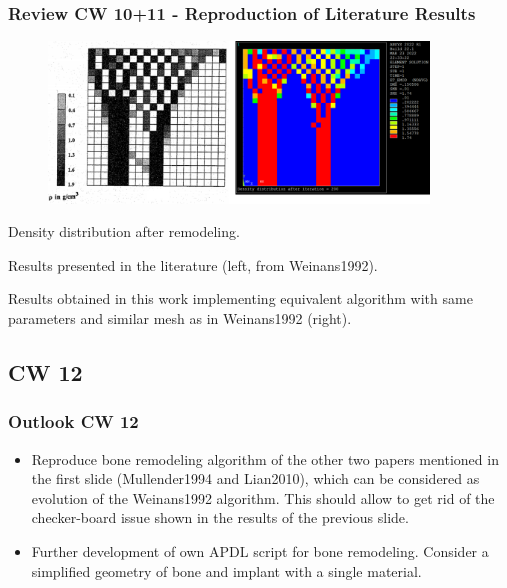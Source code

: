 \begin{frame}
  \frametitle{Review CW 10+11 - Reproduction of Literature Results}
	\begin{figure}
		\includegraphics[width=0.9\textwidth]{pictures/2022_CW10+11_2}
	\end{figure}
	\centering Density distribution after remodeling. 
	
	\centering Results presented in the literature (left, from Weinans1992).
	
	\centering Results obtained in this work implementing equivalent algorithm with same parameters and similar mesh as in Weinans1992 (right).
\end{frame}

\subsection{CW 12}
\begin{frame}
  \frametitle{Outlook CW 12}
	\begin{itemize}
		\item Reproduce bone remodeling algorithm of the other two papers mentioned in the first slide (Mullender1994 and Lian2010), which can be considered as evolution of the Weinans1992 algorithm. This should allow to get rid of the checker-board issue shown in the results of the previous slide.
		\item Further development of own APDL script for bone remodeling. Consider a simplified geometry of bone and implant with a single material.
	\end{itemize}
\end{frame}

